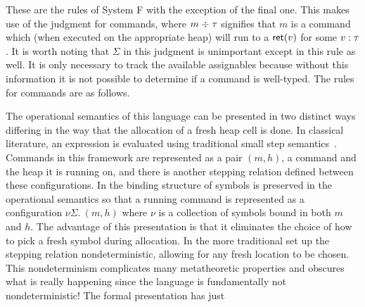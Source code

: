 These are the rules of System F with the exception of the final
one. This makes use of the judgment for commands, where
$m \mathrel{\div} \tau$ signifies that $m$ is a command which (when executed
on the appropriate heap) will run to a $\mathsf{ret}(v)$ for some
$v \mathrel{:} \tau$. It is worth noting that $\Sigma$ in this judgment is
unimportant except in this rule as well. It is only necessary to track
the available assignables because without this information it is not
possible to determine if a command is well-typed. The rules for
commands are as follows.
The operational semantics of this language can be presented in two
distinct ways differing in the way that the allocation of a fresh heap
cell is done. In classical literature, an expression is evaluated
using traditional small step
semantics~\citep{TODO-SMALL-STEP}. Commands in this framework are
represented as a pair $(m, h)$, a command and the heap it is running
on, and there is another stepping relation defined between these
configurations. In \citet{TODO-PFPL} the binding structure of symbols is
preserved in the operational semantics so that a running command is
represented as a configuration $\nu \Sigma.\ (m, h)$ where $\nu$ is a
collection of symbols bound in both $m$ and $h$. The advantage of this
presentation is that it eliminates the choice of how to pick a fresh
symbol during allocation. In the more traditional set up the stepping
relation nondeterministic, allowing for any fresh location to be
chosen. This nondeterminism complicates many metatheoretic properties
and obscures what is really happening since the language is
fundamentally not nondeterministic! The formal presentation has just
